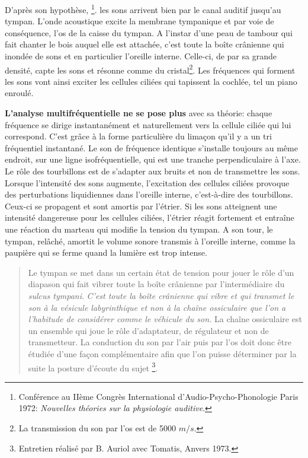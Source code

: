       
D'après son hypothèse, \footnote{Conférence au IIème Congrès International d'Audio-Psycho-Phonologie
Paris 1972:  \emph{Nouvelles théories sur la physiologie auditive}.}.
 les sons arrivent bien par le canal auditif
jusqu'au tympan. L'onde acoustique excite la membrane tympanique et
par voie de conséquence, l'os de la caisse du tympan. 
A l'instar d'une
peau de tambour qui fait chanter le bois auquel elle est attachée,
c'est toute la boîte crânienne qui inondée de sons et en particulier
l'oreille interne. Celle-ci, de par sa grande densité, capte les sons
et résonne comme du cristal\footnote{La transmission du son par l'os est de 
5000 $m/s$.}.
Les fréquences qui forment les sons vont ainsi exciter les cellules
ciliées qui tapissent la cochlée, tel un piano enroulé.
{\textbf{L'analyse multifréquentielle ne se pose plus} 
avec sa théorie: chaque fréquence se dirige instantanément et
naturellement vers la cellule ciliée qui lui correspond. 
C'est grâce à la forme particulière du limaçon qu'il y a un tri fréquentiel 
instantané.
Le son de fréquence identique s'installe toujours au même endroit, sur une 
ligne isofréquentielle, qui est une tranche perpendiculaire à l'axe.
Le rôle des tourbillons est de s'adapter aux bruits
et non de transmettre les sons.
Lorsque l'intensité des sons aug\-men\-te,
l'ex\-ci\-ta\-tion des cellules ciliées provoque des perturbations liquidiennes
dans l'oreille interne, c'est-à-dire des tourbillons. Ceux-ci se propagent
et sont amortis par l'étrier. Si les sons atteignent une intensité
dangereuse pour les cellules ciliées, l'étrier réagit fortement et
entraîne une réaction du marteau qui modifie la tension du tympan.
A son tour, le tympan, relâché, amortit le volume sonore transmis
à l'oreille interne, comme la paupière qui se ferme quand la lumière
est trop intense.


\begin{quotation}
	Le tympan se met dans un certain état de tension pour jouer le
	rôle d'un diapason qui fait vibrer toute la boîte crânienne
	par l'intermédiaire du \emph{sulcus tympani}. 
	\emph{C'est toute la boîte crânienne qui vibre et qui transmet le son à 
la vésicule labyrinthique et non à la chaîne ossiculaire que l'on a l'habitude 
de considérer comme le véhicule du son.} La chaîne ossiculaire est un ensemble 
qui
	joue le rôle d'adaptateur, de régulateur et non de transmetteur. La
	conduction du son par l'air puis par l'os doit donc
	être étudiée d'une façon complémentaire afin que l'on
	puisse déterminer par la suite la posture d'écoute du sujet%
	\footnote{Entretien réalisé par B. Auriol avec Tomatis, Anvers 
1973.}.


\end{quotation}}
